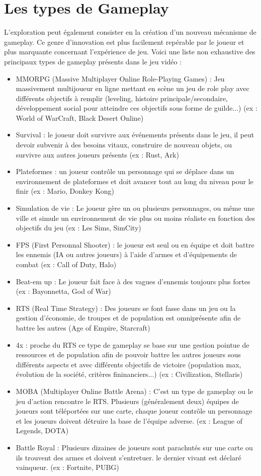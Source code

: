 \section{Les types de Gameplay}
L'exploration peut également consister en la création d'un nouveau mécanisme de gameplay. Ce genre d'innovation est plus facilement repérable par le joueur et plus marquante concernant l'expérience de jeu. Voici une liste non exhaustive des principaux types de gameplay présents dans le jeu vidéo :
\begin{itemize}
    \item MMORPG (Massive Multiplayer Online Role-Playing Games) : Jeu massivement multijoueur en ligne mettant en scène un jeu de role play avec différents objectifs à remplir (leveling, histoire principale/secondaire, développement social pour atteindre ces objectifs sous forme de guilde...) (ex : World of WarCraft, Black Desert Online)
    \item Survival : le joueur doit survivre aux événements présents dans le jeu, il peut devoir subvenir à des besoins vitaux, construire de nouveau objets, ou survivre aux autres joueurs présents (ex : Rust, Ark)
    \item Plateformes : un joueur contrôle un personnage qui se déplace dans un environnement de plateformes et doit avancer tout au long du niveau pour le finir (ex : Mario, Donkey Kong)
    \item Simulation de vie : Le joueur gère un ou plusieurs personnages, ou même une ville et simule un environnement de vie plus ou moins réaliste en fonction des objectifs du jeu (ex : Les Sims, SimCity)
    \item FPS (First Personnal Shooter) : le joueur est seul ou en équipe et doit battre les ennemis (IA ou autres joueurs) à l'aide d'armes et d'équipements de combat (ex : Call of Duty, Halo)
    \item Beat-em up : Le joueur fait face à des vagues d'ennemis toujours plus fortes (ex : Bayonnetta, God of War)
    \item RTS (Real Time Strategy) : Des joueurs se font fasse dans un jeu ou la gestion d'économie, de troupes et de population est omniprésente afin de battre les autres (Age of Empire, Starcraft)
    \item 4x : proche du RTS ce type de gameplay se base sur une gestion pointue de ressources et de population afin de pouvoir battre les autres joueurs sous différents aspects et avec différents objectifs de victoire (population max, évolution de la société, critères fininanciers...) (ex : Civilization, Stellaris)
    \item MOBA (Multiplayer Online Battle Arena) : C'est un type de gameplay ou le jeu d'action rencontre le RTS. Plusieurs (généralement deux) équipes de joueurs sont téléportées sur une carte, chaque joueur contrôle un personnage et les joueurs doivent détruire la base de l'équipe adverse. (ex : League of Legends, DOTA)
    \item Battle Royal : Plusieurs dizaines de joueurs sont parachutés sur une carte ou ils trouvent des armes et doivent s'entretuer. le dernier vivant est déclaré vainqueur. (ex : Fortnite, PUBG)
\end{itemize}

